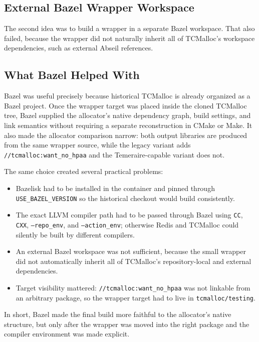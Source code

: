 \documentclass[a4paper,11pt]{article}
\begin{document}
\subsection{External Bazel Wrapper Workspace}

The second idea was to build a wrapper in a separate Bazel workspace.
That also failed, because the wrapper did not naturally inherit all of TCMalloc's workspace dependencies, such as external Abseil references.

\subsection{What Bazel Helped With}

Bazel was useful precisely because historical TCMalloc is already organized as
a Bazel project. Once the wrapper target was placed inside the cloned TCMalloc
tree, Bazel supplied the allocator's native dependency graph, build settings,
and link semantics without requiring a separate reconstruction in CMake or
Make. It also made the allocator comparison narrow: both output libraries are
produced from the same wrapper source, while the legacy variant adds
\texttt{//tcmalloc:want\_no\_hpaa} and the Temeraire-capable variant does not.

The same choice created several practical problems:

\begin{itemize}[leftmargin=1.5em]
  \item Bazelisk had to be installed in the container and pinned through
  \texttt{USE\_BAZEL\_VERSION} so the historical checkout would build
  consistently.
  \item The exact LLVM compiler path had to be passed through Bazel using
  \texttt{CC}, \texttt{CXX}, \texttt{--repo\_env}, and
  \texttt{--action\_env}; otherwise Redis and TCMalloc could silently be built
  by different compilers.
  \item An external Bazel workspace was not sufficient, because the small
  wrapper did not automatically inherit all of TCMalloc's repository-local and
  external dependencies.
  \item Target visibility mattered: \texttt{//tcmalloc:want\_no\_hpaa} was not
  linkable from an arbitrary package, so the wrapper target had to live in
  \texttt{tcmalloc/testing}.
\end{itemize}

In short, Bazel made the final build more faithful to the allocator's native
structure, but only after the wrapper was moved into the right package and the
compiler environment was made explicit.
\end{document}
